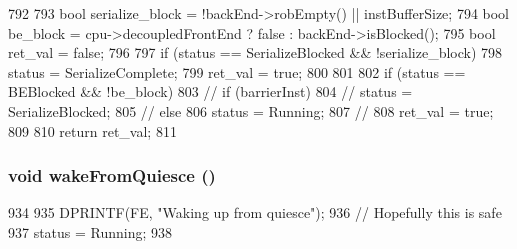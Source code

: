 \begin{DoxyCode}
792 {
793     bool serialize_block = !backEnd->robEmpty() || instBufferSize;
794     bool be_block = cpu->decoupledFrontEnd ? false : backEnd->isBlocked();
795     bool ret_val = false;
796 
797     if (status == SerializeBlocked && !serialize_block) {
798         status = SerializeComplete;
799         ret_val = true;
800     }
801 
802     if (status == BEBlocked && !be_block) {
803 //        if (barrierInst) {
804 //            status = SerializeBlocked;
805 //        } else {
806             status = Running;
807 //        }
808         ret_val = true;
809     }
810     return ret_val;
811 }
\end{DoxyCode}
\hypertarget{classFrontEnd_a040cbeac7187b0b8cdb1242d3f5aa179}{
\subsubsection[{wakeFromQuiesce}]{\setlength{\rightskip}{0pt plus 5cm}void wakeFromQuiesce ()}}
\label{classFrontEnd_a040cbeac7187b0b8cdb1242d3f5aa179}



\begin{DoxyCode}
934 {
935     DPRINTF(FE, "Waking up from quiesce\n");
936     // Hopefully this is safe
937     status = Running;
938 }
\end{DoxyCode}



